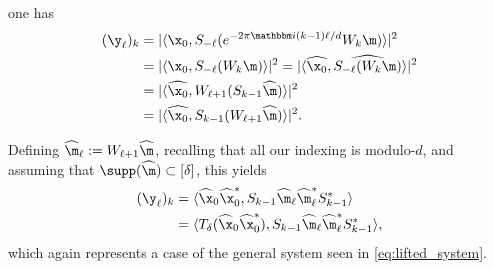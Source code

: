  one has
%
\begin{align}
    (\y_\ell)_k &=  \lvert \langle  \x_0, S_{-\ell}(e^{-2\pi \mathbbm i (k-1)\ell/d}W_k\m )\rangle \rvert^2 \notag \\
       & =  \lvert \langle  \x_0, S_{-\ell}(W_k\m )\rangle \rvert^2 \notag 
       =  \lvert \langle  \widehat{\x_0}, \widehat{S_{-\ell}(W_k\m )}\rangle \rvert^2 \notag \\
       & = \lvert \langle  \widehat{\x_0}, W_{\ell+1}(S_{k-1}\widehat{\m} )\rangle \rvert^2 \notag \\ 
       &=\lvert \langle  \widehat{\x_0}, S_{k-1}(W_{\ell+1}\widehat{\m} )\rangle \rvert^2.
       \end{align}

Defining $\widehat{\m}_\ell := W_{\ell+1}\widehat{\m}$, recalling that all our indexing is modulo-$d$, and assuming that $\supp(\widehat{\m})\subset [\delta]$, this yields
\begin{align}%
%
    (\y_\ell)_{k}   &= \langle \widehat\x_0 \widehat\x_0^*, S_{k-1} \widehat{\m}_\ell \widehat{\m}_\ell^* S_{k-1}^*\rangle \notag\\
   &= \langle T_\delta(\widehat\x_0 \widehat\x_0^*), S_{k-1} \widehat{\m}_\ell \widehat{\m}_\ell^* S_{k-1}^*\rangle, \notag
\end{align}
which again represents a case of the general system seen in \eqref{eq:lifted_system}.

